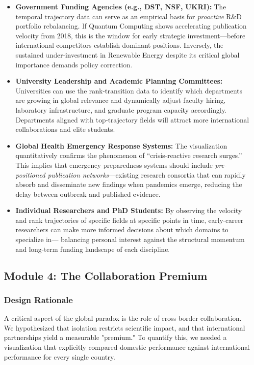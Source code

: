 \documentclass[12pt,a4paper]{article}
\begin{document}
\begin{itemize}
    \item \textbf{Government Funding Agencies (e.g., DST, NSF, UKRI):} The temporal
    trajectory data can serve as an empirical basis for \textit{proactive} R\&D portfolio
    rebalancing. If Quantum Computing shows accelerating publication velocity from 2018,
    this is the window for early strategic investment---before international competitors
    establish dominant positions. Inversely, the sustained under-investment in Renewable
    Energy despite its critical global importance demands policy correction.

    \item \textbf{University Leadership and Academic Planning Committees:} Universities
    can use the rank-transition data to identify which departments are growing in global
    relevance and dynamically adjust faculty hiring, laboratory infrastructure, and
    graduate program capacity accordingly. Departments aligned with top-trajectory fields
    will attract more international collaborations and elite students.

    \item \textbf{Global Health Emergency Response Systems:} The visualization
    quantitatively confirms the phenomenon of ``crisis-reactive research surges.'' This
    implies that emergency preparedness systems should include \textit{pre-positioned
    publication networks}---existing research consortia that can rapidly absorb and
    disseminate new findings when pandemics emerge, reducing the delay between outbreak
    and published evidence.

    \item \textbf{Individual Researchers and PhD Students:} By observing the velocity and
    rank trajectories of specific fields at specific points in time, early-career
    researchers can make more informed decisions about which domains to specialize in---
    balancing personal interest against the structural momentum and long-term funding
    landscape of each discipline.
\end{itemize}

\subsection{Module 4: The Collaboration Premium}

\subsubsection{Design Rationale}
A critical aspect of the global paradox is the role of cross-border collaboration. We hypothesized that isolation restricts scientific impact, and that international partnerships yield a measurable "premium." To quantify this, we needed a visualization that explicitly compared domestic performance against international performance for every single country.
\end{document}
